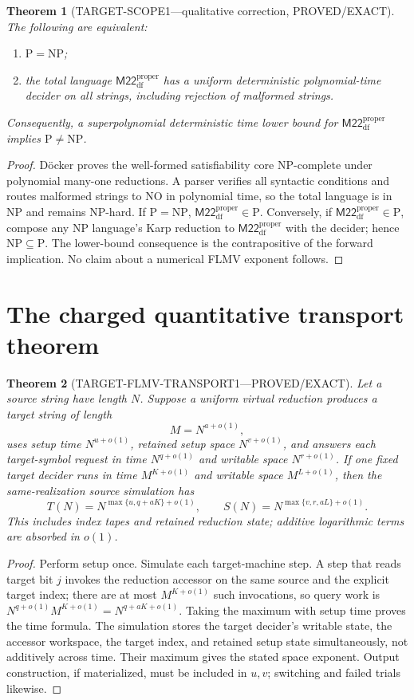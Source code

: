 \documentclass[11pt]{article}
\newtheorem{theorem}{Theorem}
\newcommand{\M}{\mathsf{M22}^{\mathrm{proper}}_{\mathrm{df}}}
\begin{document}
\begin{theorem}[TARGET-SCOPE1---qualitative correction, PROVED/EXACT]
The following are equivalent:
\begin{enumerate}
\item $\mathrm{P}=\mathrm{NP}$;
\item the total language $\M$ has a uniform deterministic polynomial-time decider on
all strings, including rejection of malformed strings.
\end{enumerate}
Consequently, a superpolynomial deterministic time lower bound for $\M$ implies
$\mathrm{P}\ne\mathrm{NP}$.
\end{theorem}

\begin{proof}
D\"ocker proves the well-formed satisfiability core NP-complete under polynomial
many-one reductions.  A parser verifies all syntactic conditions and routes malformed
strings to NO in polynomial time, so the total language is in NP and remains NP-hard.
If $\mathrm{P}=\mathrm{NP}$, $\M\in\mathrm P$.  Conversely, if $\M\in\mathrm P$,
compose any NP language's Karp reduction to $\M$ with the decider; hence
$\mathrm{NP}\subseteq\mathrm P$.  The lower-bound consequence is the contrapositive
of the forward implication.  No claim about a numerical FLMV exponent follows.
\end{proof}

\section{The charged quantitative transport theorem}

\begin{theorem}[TARGET-FLMV-TRANSPORT1---PROVED/EXACT]
Let a source string have length $N$.  Suppose a uniform virtual reduction produces a
target string of length
\[
M=N^{a+o(1)},
\]
uses setup time $N^{u+o(1)}$, retained setup space $N^{v+o(1)}$, and answers each
target-symbol request in time $N^{q+o(1)}$ and writable space $N^{r+o(1)}$.
If one fixed target decider runs in time $M^{K+o(1)}$ and writable space
$M^{L+o(1)}$, then the same-realization source simulation has
\[
T(N)=N^{\max\{u,q+aK\}+o(1)},\qquad
S(N)=N^{\max\{v,r,aL\}+o(1)}.
\]
This includes index tapes and retained reduction state; additive logarithmic terms are
absorbed in $o(1)$.
\end{theorem}

\begin{proof}
Perform setup once.  Simulate each target-machine step.  A step that reads target bit
$j$ invokes the reduction accessor on the same source and the explicit target index;
there are at most $M^{K+o(1)}$ such invocations, so query work is
$N^{q+o(1)}M^{K+o(1)}=N^{q+aK+o(1)}$.  Taking the maximum with setup time proves the
time formula.  The simulation stores the target decider's writable state, the accessor
workspace, the target index, and retained setup state simultaneously, not additively
across time.  Their maximum gives the stated space exponent.  Output construction,
if materialized, must be included in $u,v$; switching and failed trials likewise.
\end{proof}
\end{document}
